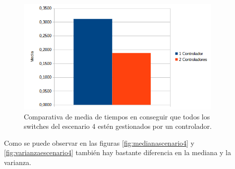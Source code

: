 \documentclass[a4paper, 12pt]{book}
\begin{document}
	\begin{figure}[H]
		\centering
		\includegraphics[width=10cm, keepaspectratio]{img/comparativamediaescenario4}
		\caption{Comparativa de media de tiempos en conseguir que todos los switches del escenario 4 estén gestionados por un controlador.}
		\label{figura:mediaescenario4}
	\end{figure}
	

	Como se puede observar en las figuras \ref{fig:medianascenario4} y \ref{fig:varianzaescenario4} también hay bastante diferencia en la mediana y la varianza. 
	
\end{document}
